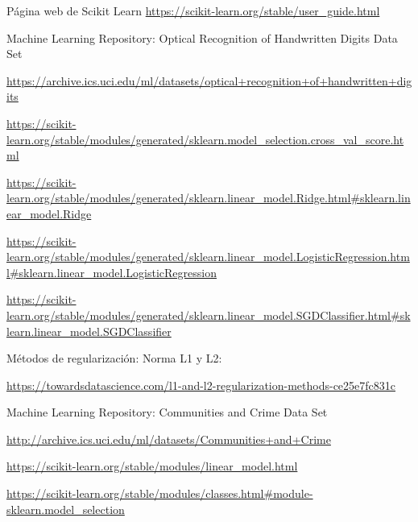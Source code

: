 \documentclass[12pt, spanish]{article}
\begin{document}
\begin{thebibliography}{9}


Página web de Scikit Learn
\url{https://scikit-learn.org/stable/user_guide.html}


Machine Learning Repository: Optical Recognition of Handwritten Digits Data Set 

\url{https://archive.ics.uci.edu/ml/datasets/optical+recognition+of+handwritten+digits}


\url{https://scikit-learn.org/stable/modules/generated/sklearn.model_selection.cross_val_score.html}



\url{https://scikit-learn.org/stable/modules/generated/sklearn.linear_model.Ridge.html#sklearn.linear_model.Ridge}

\url{https://scikit-learn.org/stable/modules/generated/sklearn.linear_model.LogisticRegression.html#sklearn.linear_model.LogisticRegression}

\url{https://scikit-learn.org/stable/modules/generated/sklearn.linear_model.SGDClassifier.html#sklearn.linear_model.SGDClassifier}

Métodos de regularización: Norma L1 y L2:

\url{https://towardsdatascience.com/l1-and-l2-regularization-methods-ce25e7fc831c}


Machine Learning Repository: Communities and Crime Data Set  

\url{http://archive.ics.uci.edu/ml/datasets/Communities+and+Crime}

\url{https://scikit-learn.org/stable/modules/linear_model.html}

\url{https://scikit-learn.org/stable/modules/classes.html#module-sklearn.model_selection}

\end{thebibliography}
\end{document}
